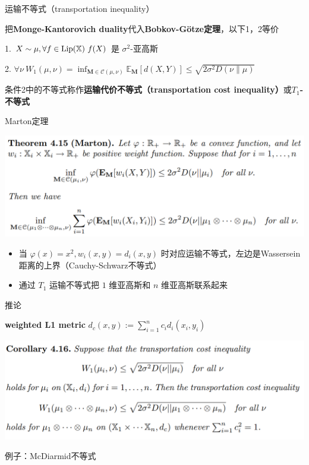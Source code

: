 \documentclass{beamer}
\begin{document}
\begin{frame}{运输不等式（transportation inequality）}

把\textbf{Monge-Kantorovich duality}代入\textbf{Bobkov-G{\"o}tze定理}，以下1，2等价

1. $X\sim\mu, \forall f\in{\rm Lip}(\mathbb{X})\ f(X)$ 是 $\sigma^2$-亚高斯

2. $\forall \nu\ W_1(\mu, \nu) = \inf_{\mathbf{M} \in \mathcal{C}(\mu,\nu)} \mathbb{E}_{\mathbf{M}} [d(X, Y)] \le \sqrt{2\sigma^{2}D(\nu\|\mu)}$

条件2中的不等式称作\textbf{运输代价不等式（transportation cost inequality）}或\textbf{$T_1$-不等式}

\end{frame}

\begin{frame}{Marton定理}

\begin{center}
\includegraphics[width=1.0\textwidth, frame]{figures/4-15-thm.png}
\end{center}

\begin{itemize}
    \item 当 $\varphi(x)=x^2, w_i(x, y) = d_i(x, y)$ 时对应运输不等式，左边是Wassersein距离的上界（Cauchy-Schwarz不等式）
    \item 通过 $T_1$ 运输不等式把 $1$ 维亚高斯和 $n$ 维亚高斯联系起来
\end{itemize}

\end{frame}

\begin{frame}{推论}

\textbf{weighted L1 metric} $d_c(x, y) := \sum_{i=1}^{n} c_i d_i(x_i, y_i)$

\begin{center}
\includegraphics[width=1.0\textwidth, frame]{figures/4-16-corollary.png}
\end{center}

例子：McDiarmid不等式

\end{frame}
\end{document}
